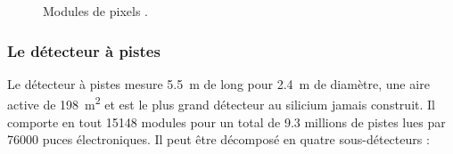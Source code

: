 	\begin{figure}[ht!]
	\centering
	\hfill
	\caption{Modules de pixels \cite{Dominguez:1481838}.}
	\label{module}
\end{figure}
\subsubsection{Le détecteur à pistes}
Le détecteur à pistes mesure \SI{5.5}{\meter} de long pour \SI{2.4}{\meter} de diamètre, une aire active de \SI{198}{\square\meter} et est le plus grand détecteur au silicium jamais construit. Il comporte en tout \num{15148} modules pour un total de \num{9.3} millions de pistes lues par \num{76000} puces électroniques. Il peut être décomposé en quatre sous-détecteurs :


